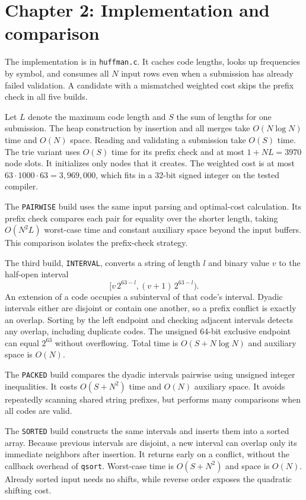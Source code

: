 \documentclass[11pt,a4paper]{article}
\begin{document}
\section{Chapter 2: Implementation and comparison}
The implementation is in \texttt{huffman.c}. It caches code lengths, looks up frequencies by symbol, and consumes all $N$ input rows even when a submission has already failed validation. A candidate with a mismatched weighted cost skips the prefix check in all five builds.

Let $L$ denote the maximum code length and $S$ the sum of lengths for one submission. The heap construction by insertion and all merges take $O(N\log N)$ time and $O(N)$ space. Reading and validating a submission take $O(S)$ time. The trie variant uses $O(S)$ time for its prefix check and at most $1+NL=3970$ node slots. It initializes only nodes that it creates. The weighted cost is at most $63\cdot1000\cdot63=3{,}969{,}000$, which fits in a 32-bit signed integer on the tested compiler.

The \texttt{PAIRWISE} build uses the same input parsing and optimal-cost calculation. Its prefix check compares each pair for equality over the shorter length, taking $O(N^2L)$ worst-case time and constant auxiliary space beyond the input buffers. This comparison isolates the prefix-check strategy.

The third build, \texttt{INTERVAL}, converts a string of length $l$ and binary value $v$ to the half-open interval
\[
[v\,2^{63-l},(v+1)\,2^{63-l}).
\]
An extension of a code occupies a subinterval of that code's interval. Dyadic intervals either are disjoint or contain one another, so a prefix conflict is exactly an overlap. Sorting by the left endpoint and checking adjacent intervals detects any overlap, including duplicate codes. The unsigned 64-bit exclusive endpoint can equal $2^{63}$ without overflowing. Total time is $O(S+N\log N)$ and auxiliary space is $O(N)$.


The \texttt{PACKED} build compares the dyadic intervals pairwise using unsigned integer inequalities. It costs $O(S+N^2)$ time and $O(N)$ auxiliary space. It avoids repeatedly scanning shared string prefixes, but performs many comparisons when all codes are valid.

The \texttt{SORTED} build constructs the same intervals and inserts them into a sorted array. Because previous intervals are disjoint, a new interval can overlap only its immediate neighbors after insertion. It returns early on a conflict, without the callback overhead of \texttt{qsort}. Worst-case time is $O(S+N^2)$ and space is $O(N)$. Already sorted input needs no shifts, while reverse order exposes the quadratic shifting cost.
\end{document}
